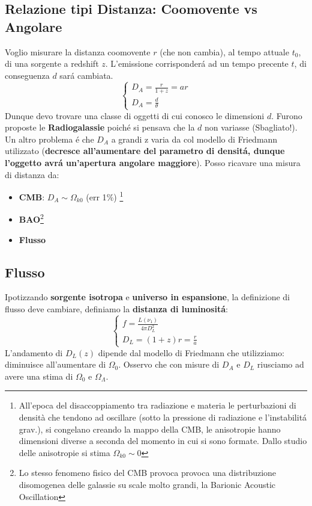 \documentclass[12pt, a4paper]{article}
\begin{document}
\subsection{Relazione tipi Distanza: Coomovente vs Angolare}
Voglio misurare la distanza coomovente $r$ (che non cambia), al tempo attuale $t_0$, di una sorgente a redshift $z$. L'emissione corrisponder\'{a} ad un tempo precente $t$, di conseguenza $d$ sar\'{a} cambiata.
\begin{equation}
     \begin{cases}
         D_A=\frac{r}{1+z}=ar
         \\
         D_A=\frac{d}{\theta}
     \end{cases}
\end{equation}
Dunque devo trovare una classe di oggetti di cui conosco le dimensioni $d$. Furono proposte le \textbf{Radiogalassie} poich\'{e} si pensava che la $d$ non variasse (Sbagliato!). Un altro problema \'{e} che $D_A$ a grandi z varia da col modello di Friedmann utilizzato (\textbf{decresce all'aumentare del parametro di densit\'{a}, dunque l'oggetto avr\'{a} un'apertura angolare maggiore}). Posso ricavare una misura di distanza da:
\begin{itemize}
    \item \textbf{CMB}: $D_A \sim \Omega_{k0}$ (err 1$\%$) \footnote{All'epoca del disaccoppiamento tra radiazione e materia le perturbazioni di densità che tendono ad oscillare (sotto la pressione di radiazione e l'instabilit\'{a} grav.), si congelano creando la mappo della CMB, le anisotropie hanno dimensioni diverse a seconda del momento in cui si sono formate. Dallo studio delle anisotropie si stima $\Omega_{k0}\sim 0$}
    \item \textbf{BAO}\footnote{Lo stesso fenomeno fisico del CMB provoca provoca una distribuzione disomogenea delle galassie su scale molto grandi, la Barionic Acoustic Oscillation}
    \item \textbf{Flusso}
\end{itemize}
\subsection{Flusso}
Ipotizzando \textbf{sorgente isotropa} e \textbf{universo in espansione}, la definizione di flusso deve cambiare, definiamo la \textbf{distanza di luminosit\'{a}}:
\begin{equation}
     \begin{cases}
         f=\frac{L(\nu_1)}{4 \pi D_L^2}
         \\
         D_L=(1+z)r=\frac{r}{a}
     \end{cases}
\end{equation}
L'andamento di $D_L(z)$ dipende dal modello di Friedmann che utilizziamo: diminuisce all'aumentare di $\Omega_0$. Osservo che con misure di $D_A$ e $D_L$ riusciamo ad avere una stima di $\Omega_0$ e $\Omega_\Lambda$.
\end{document}
